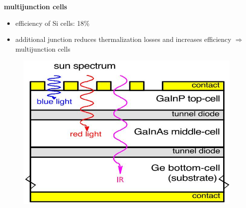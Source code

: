 \noindent \textbf{multijunction cells}
\begin{itemize}
 \item efficiency of Si cells: 18\%
 \item additional junction reduces thermalization losses and increases efficiency $\Rightarrow$ multijunction cells
\end{itemize}
\begin{figure}[!ht]
 \centering
 \includegraphics[scale=0.5]{triplejunction}
\end{figure}

